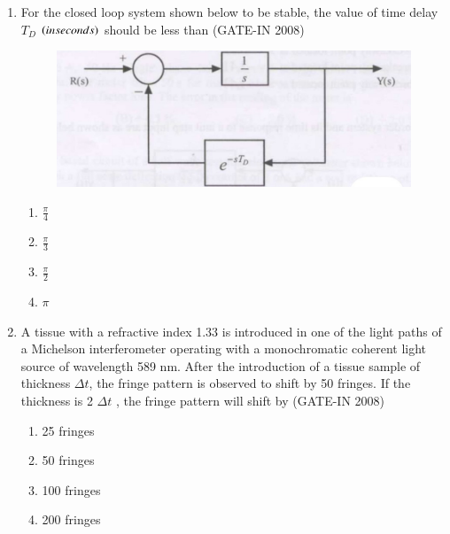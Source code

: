 \documentclass[journal,12pt,onecolumn]{IEEEtran}
\theoremstyle{remark}
\begin{document}
\begin{enumerate}
\item For the closed loop system shown below  to be stable, the value of time delay $T_D$  $\left(in seconds\right)$
should be less than \hfill{(GATE-IN 2008)}
\begin{figure}[H]
    \centering
    \includegraphics[width=0.5\columnwidth]{figs/i31.jpg}
    \caption{}
    \label{fig:placeholder31}
\end{figure}
\begin{multicols}{4}
           \begin{enumerate} 
              \item $\frac{\pi}{4}$           
              \item $\frac{\pi}{3}$           
              \item $\frac{\pi}{2}$           
              \item ${\pi}$           
            \end{enumerate} 
            \end{multicols}

\item A tissue with a refractive index 1.33 is introduced in one of the light paths of a Michelson
interferometer operating with a monochromatic coherent light source of wavelength 589 nm. After
the introduction of a tissue sample of thickness $\Delta$$t$, the fringe pattern is observed to shift by
50 fringes. If the thickness is 2 $\Delta$$t$ , the fringe pattern will shift by \hfill{(GATE-IN 2008)}
\begin{multicols}{4}
           \begin{enumerate} 
              \item 25 fringes        
              \item 50 fringes
              \item 100 fringes
              \item 200 fringes
            \end{enumerate}
            \end{multicols}


\end{enumerate}
\end{document}
